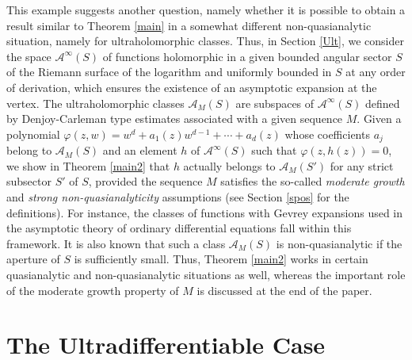 \documentclass[a4paper]{amsart}
\theoremstyle{plain}
\theoremstyle{remark}
\begin{document}
This example suggests another question, namely whether it is possible to obtain a result similar to Theorem \ref{main} in a somewhat different non-quasianaly\-tic situation, namely for ultraholomorphic classes. Thus, in Section \ref{Ult}, we consider the space $ \mathcal{A}^\infty(S) $ of functions holomorphic in a given bounded angular sector $ S $ of the Riemann surface of the logarithm and uniformly bounded in $ S $ at any order of derivation, which ensures the existence of an asymptotic expansion at the vertex. The ultraholomorphic classes $ \mathcal{A}_M(S) $ are subspaces of $ \mathcal{A}^\infty(S) $ defined by Denjoy-Carleman type estimates associated with a given sequence $ M $. Given a polynomial $ \varphi(z,w)=w^d+a_1(z)w^{d-1}+\cdots+a_d(z) $ whose coefficients $ a_j $ belong to $ \mathcal{A}_M(S) $ and an element $ h $ of $ \mathcal{A}^\infty(S) $ such that $ \varphi(z,h(z))=0 $, we show in Theorem \ref{main2} that $ h $ actually belongs to $ \mathcal{A}_M(S') $ for any strict subsector $ S' $ of $ S $, provided the sequence $ M $ satisfies the so-called \emph{moderate growth} and \emph{strong non-quasianalyticity} assumptions (see Section \ref{spos} for the definitions). For instance, the classes of functions with Gevrey expansions used in the asymptotic theory of ordinary differential equations fall within this framework.  It is also known that such a class $ \mathcal{A}_M(S) $ is non-quasianalytic if the aperture of $ S $ is sufficiently small. Thus, Theorem \ref{main2} works in certain quasianalytic and non-quasianalytic situations as well, whereas the important role of the moderate growth property of $ M $ is discussed at the end of the paper.  

\section{The Ultradifferentiable Case}\label{uqac}
\end{document}
